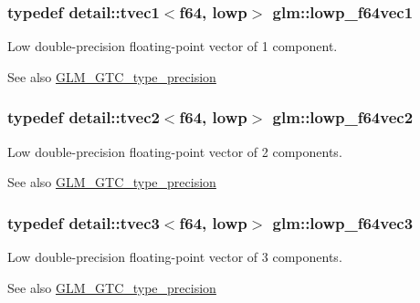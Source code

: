\subsubsection[{\texorpdfstring{lowp\+\_\+f64vec1}{lowp_f64vec1}}]{\setlength{\rightskip}{0pt plus 5cm}typedef detail\+::tvec1$<$f64, lowp$>$ {\bf glm\+::lowp\+\_\+f64vec1}}\hypertarget{group__gtc__type__precision_ga47d9eed23b6e3fc58676176be392293a}{}\label{group__gtc__type__precision_ga47d9eed23b6e3fc58676176be392293a}
Low double-\/precision floating-\/point vector of 1 component. \begin{DoxySeeAlso}{See also}
\hyperlink{group__gtc__type__precision}{G\+L\+M\+\_\+\+G\+T\+C\+\_\+type\+\_\+precision} 
\end{DoxySeeAlso}
\subsubsection[{\texorpdfstring{lowp\+\_\+f64vec2}{lowp_f64vec2}}]{\setlength{\rightskip}{0pt plus 5cm}typedef detail\+::tvec2$<$f64, lowp$>$ {\bf glm\+::lowp\+\_\+f64vec2}}\hypertarget{group__gtc__type__precision_gaf2c6cba98bb2c2f1560d8edff4b70938}{}\label{group__gtc__type__precision_gaf2c6cba98bb2c2f1560d8edff4b70938}
Low double-\/precision floating-\/point vector of 2 components. \begin{DoxySeeAlso}{See also}
\hyperlink{group__gtc__type__precision}{G\+L\+M\+\_\+\+G\+T\+C\+\_\+type\+\_\+precision} 
\end{DoxySeeAlso}
\subsubsection[{\texorpdfstring{lowp\+\_\+f64vec3}{lowp_f64vec3}}]{\setlength{\rightskip}{0pt plus 5cm}typedef detail\+::tvec3$<$f64, lowp$>$ {\bf glm\+::lowp\+\_\+f64vec3}}\hypertarget{group__gtc__type__precision_gad2d5e1436d926ae7201c860dce01a0fe}{}\label{group__gtc__type__precision_gad2d5e1436d926ae7201c860dce01a0fe}
Low double-\/precision floating-\/point vector of 3 components. \begin{DoxySeeAlso}{See also}
\hyperlink{group__gtc__type__precision}{G\+L\+M\+\_\+\+G\+T\+C\+\_\+type\+\_\+precision} 
\end{DoxySeeAlso}
